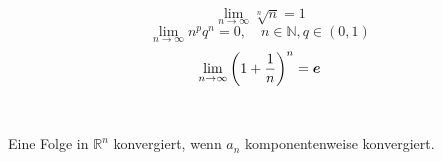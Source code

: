 \begin{multicols}{2}
\begin{theorem}
		\end{theorem}
		\\[1em]
		\begin{shortcut}
			$$ \lim\limits_{n \to \infty} \sqrt[n]{n} = 1$$
			$$ \lim\limits_{n \to \infty} n^p q^n = 0, \quad n \in \mathbb{N}, q \in (0,1) $$
			$$ \lim\limits_{n \to \infty} \left( 1 + \frac{1}{n} \right)^n = \boldsymbol{e}$$
		\end{shortcut}
		\\[1em]
		\begin{definition}
			Eine Folge in $\mathbb{R}^n$ konvergiert, wenn $a_n$ komponentenweise konvergiert.
		\end{definition}
		
	\end{multicols}